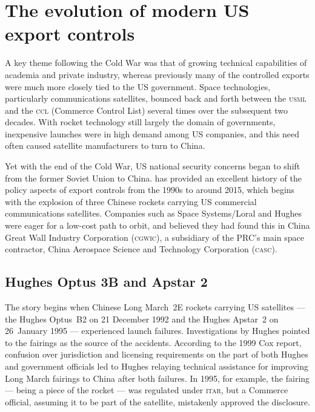 \documentclass[12pt]{olfmemo}
\begin{document}
\section{The evolution of modern US export controls}
A key theme following the Cold War was that of growing technical capabilities of academia and private industry, whereas previously many of the controlled exports were much more closely tied to the US government. Space technologies, particularly communications satellites, bounced back and forth between the \textsc{usml} and the \textsc{ccl} (Commerce Control List) several times over the subsequent two decades. With rocket technology still largely the domain of governments, inexpensive launches were in high demand among US companies, and this need often caused satellite manufacturers to turn to China.

Yet with the end of the Cold War, US national security concerns began to shift from the former Soviet Union to China. \citet{Zinger2015} has provided an excellent history of the policy aspects of export controls from the 1990s to around 2015, which begins with the explosion of three Chinese rockets carrying US commercial communications satellites. Companies such as Space Systems/Loral and Hughes were eager for a low-cost path to orbit, and believed they had found this in China Great Wall Industry Corporation (\textsc{cgwic}), a subsidiary of the PRC's main space contractor, China Aerospace Science and Technology Corporation (\textsc{casc}).

\subsection{Hughes Optus 3B and Apstar 2}
The story begins when Chinese Long March~2E rockets carrying US satellites --- the Hughes Optus~B2 on 21 December 1992 and the Hughes Apstar~2 on 26~January 1995 --- experienced launch failures. Investigations by Hughes pointed to the fairings as the source of the accidents. According to the 1999 Cox report, confusion over jurisdiction and licensing requirements on the part of both Hughes and government officials led to Hughes relaying technical assistance for improving Long March fairings to China after both failures. In 1995, for example, the fairing --- being a piece of the rocket --- was regulated under \textsc{itar}, but a Commerce official, assuming it to be part of the satellite, mistakenly approved the disclosure. \citep{Cox1999} %
\end{document}
